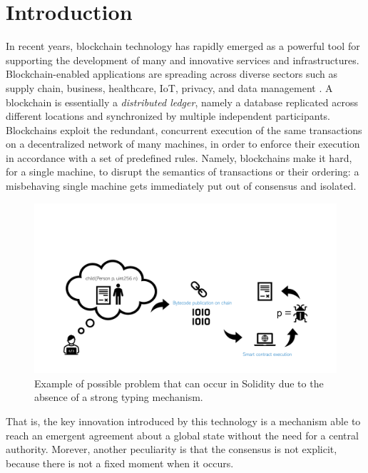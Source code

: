 \section{Introduction}\label{sec:introduction}

In recent years, blockchain technology has rapidly emerged as a powerful tool for supporting the development of many and innovative services and infrastructures. Blockchain-enabled applications are spreading across diverse sectors such as supply chain, business, healthcare, IoT, privacy, and data management \cite{blockchain_applications}. A blockchain is essentially a \textit{distributed ledger}, namely a database replicated across different locations and synchronized by multiple independent participants. Blockchains exploit the redundant, concurrent execution of the same transactions on a decentralized network of many machines, in order to enforce their execution in accordance with a set of predefined rules. Namely, blockchains make it hard, for a single machine, to disrupt the semantics of transactions or their ordering: a misbehaving single machine gets immediately put out of consensus and isolated. 
%
\begin{figure}[th]
\centering
\includegraphics[width=0.8\linewidth]{figures/solidity_problem}
\caption{Example of possible problem that can occur in Solidity due to the absence of a strong typing mechanism.}
\label{figure.solidity_problem}
\end{figure}
%
That is, the key innovation introduced by this technology is a mechanism  able to reach an emergent agreement about a global state without the need for a central authority. Morever, another peculiarity is that the consensus is not explicit, because there is not a fixed moment when it occurs.

